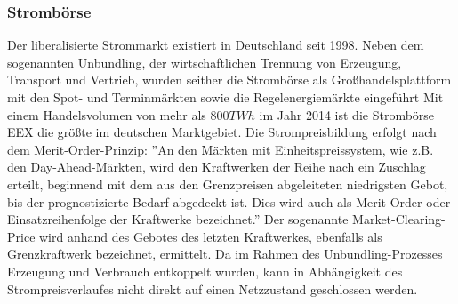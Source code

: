 \documentclass[onecolumn,10pt,titlepage]{article}
\begin{document}
\subsubsection{Strombörse}
Der liberalisierte  Strommarkt  existiert in Deutschland seit 1998. Neben dem sogenannten Unbundling, der wirtschaftlichen Trennung von Erzeugung, Transport und Vertrieb, wurden seither die Strombörse als Großhandelsplattform mit den Spot- und Terminmärkten sowie die Regelenergiemärkte eingeführt Mit einem Handelsvolumen von mehr als $800 TWh$ im Jahr 2014 ist die Strombörse EEX die größte im deutschen Marktgebiet.\cite{Zapf.2017} Die Strompreisbildung erfolgt nach dem Merit-Order-Prinzip: ''An den Märkten mit Einheitspreissystem, wie z.B. den Day-Ahead-Märkten, wird den Kraftwerken der Reihe nach ein Zuschlag erteilt, beginnend mit dem aus den Grenzpreisen abgeleiteten niedrigsten Gebot, bis der prognostizierte Bedarf abgedeckt ist. Dies wird auch als Merit Order oder Einsatzreihenfolge der Kraftwerke bezeichnet.''\cite{Zapf.2017} Der sogenannte Market-Clearing-Price wird anhand des Gebotes des letzten Kraftwerkes, ebenfalls als Grenzkraftwerk bezeichnet, ermittelt. 
Da im Rahmen des Unbundling-Prozesses Erzeugung und Verbrauch entkoppelt wurden, kann in Abhängigkeit des Strompreisverlaufes nicht direkt auf einen Netzzustand geschlossen werden.\cite{Zapf.2017}
\end{document}
